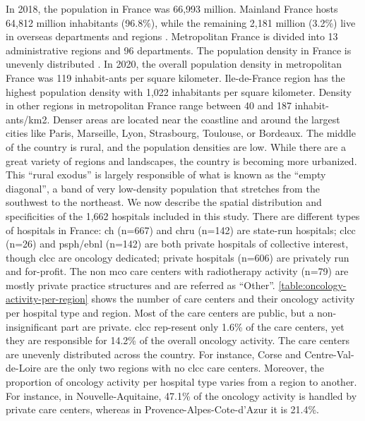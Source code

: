 In 2018, the population in France was 66,993 million. Mainland France hosts 64,812 million inhabitants (96.8\%), while the remaining 2,181 million (3.2\%) live in overseas departments and regions . Metropolitan France is divided into 13 administrative regions and 96 departments. The population density in France is unevenly distributed . In 2020, the overall population density in metropolitan France was 119 inhabit-ants per square kilometer. Ile-de-France region has the highest population density with 1,022 inhabitants per square kilometer. Density in other regions in metropolitan France range between 40 and 187 inhabit-ants/km2. Denser areas are located near the coastline and around the largest cities like Paris, Marseille, Lyon, Strasbourg, Toulouse, or Bordeaux. The middle of the country is rural, and the population densities are low. While there are a great variety of regions and landscapes, the country is becoming more urbanized. This ``rural exodus'' is largely responsible of what is known as the ``empty diagonal'', a band of very low-density population that stretches from the southwest to the northeast.
We now describe the spatial distribution and specificities of the 1,662 hospitals included in this study. There are different types of hospitals in France: \ac{ch}  (n=667) and \ac{chru}  (n=142) are state-run hospitals; \ac{clcc}  (n=26) and \ac{psph}/\ac{ebnl}  (n=142) are both private hospitals of collective interest, though \ac{clcc} are oncology dedicated; private hospitals (n=606) are privately run and for-profit. The non \ac{mco} care centers with radiotherapy activity (n=79) are mostly private practice structures and are referred as “Other”. \cref{table:oncology-activity-per-region} shows the number of care centers and their oncology activity per hospital type and region. Most of the care centers are public, but a non-insignificant part are private. \ac{clcc} rep-resent only 1.6\% of the care centers, yet they are responsible for 14.2\% of the overall oncology activity. The care centers are unevenly distributed across the country. For instance, Corse and Centre-Val-de-Loire are the only two regions with no \ac{clcc} care centers. Moreover, the proportion of oncology activity per hospital type varies from a region to another. For instance, in Nouvelle-Aquitaine, 47.1\% of the oncology activity is handled by private care centers, whereas in Provence-Alpes-Cote-d'Azur it is 21.4\%.

